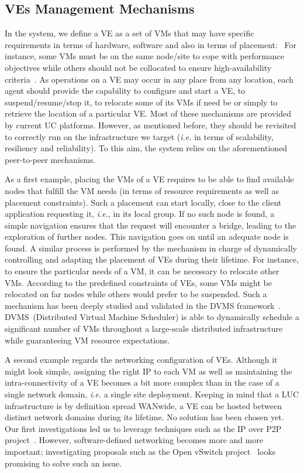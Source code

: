 \subsection{VEs Management Mechanisms}
\label{ssec:vem}
In the \discovery system, we define a VE as a set of VMs that may have specific
requirements in terms of hardware, software and also in terms of placement:~
For instance, some VMs must be on the same node/site to cope with performance objectives while
others should not be collocated to ensure
high-availability criteria~\cite{hermenier:2013}.
As operations on a VE may occur in any place from any location, each agent should provide the capability
to configure and start a VE, to suspend/resume/stop it, to relocate some of its VMs if need be or simply to retrieve the location of a particular VE. 
Most of these mechanisms are provided by current UC platforms. However, as mentioned before, they
should be revisited to correctly run on the infrastructure we target
(\textit{i.e.} in terms of scalability, resiliency and reliability).
To this aim, the \discovery system relies on the aforementioned peer-to-peer mechanisms. 

As a first example, placing the VMs of a VE requires to be able to find available nodes that
fulfill the VM needs (in terms of resource requirements as well as placement
constraints). Such a placement can start locally, close to the client
application requesting it, \textit{i.e.}, in its local group. If no such node is
found, a simple navigation ensures that the request will encounter a bridge,
leading to the exploration of further nodes. This navigation goes
on until an adequate node is found.
A similar process is performed by the mechanism in charge of  dynamically
controlling and adapting the placement of VEs during their lifetime.  For instance, 
to ensure the particular needs of a VM, it can be necessary to relocate other VMs.
According to the predefined constraints of VEs, some VMs might be
relocated on far nodes while others would prefer to be suspended.  Such a
mechanism has been deeply studied and validated in the DVMS
framework~\cite{dvms:wiki,quesnel:2012}. DVMS~(Distributed Virtual
Machine Scheduler) is able to dynamically schedule a significant number of VMs
throughout a large-scale distributed infrastructure while guaranteeing VM
resource expectations.  

A second example regards the networking configuration of VEs.
Although it might look simple, assigning the right IP to
each VM as well as maintaining the intra-connectivity of a VE becomes a bit more complex than in
the case of a single network domain, \textit{i.e.} a single site deployment.
%
Keeping in mind that a LUC infrastructure is
by definition spread WANwide, a VE can be hosted between distinct network
domains during its lifetime. No solution has been chosen yet. 
Our first investigations led us to leverage techniques
such as the IP over P2P project~\cite{ganguly:2006}. However,
software-defined networking becomes more and more important; investigating proposals such as
the Open vSwitch project~\cite{pfaff:2009} looks promising to solve such an issue.
%

